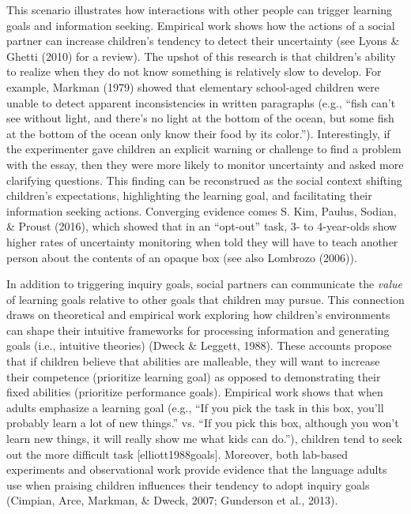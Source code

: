\documentclass[oneside]{report}
\begin{document}
This scenario illustrates how interactions with other people can trigger
learning goals and information seeking. Empirical work shows how the
actions of a social partner can increase children's tendency to detect
their uncertainty (see Lyons \& Ghetti (2010) for a review). The upshot
of this research is that children's ability to realize when they do not
know something is relatively slow to develop. For example, Markman
(1979) showed that elementary school-aged children were unable to detect
apparent inconsistencies in written paragraphs (e.g., ``fish can't see
without light, and there's no light at the bottom of the ocean, but some
fish at the bottom of the ocean only know their food by its color.'').
Interestingly, if the experimenter gave children an explicit warning or
challenge to find a problem with the essay, then they were more likely
to monitor uncertainty and asked more clarifying questions. This finding
can be reconstrued as the social context shifting children's
expectations, highlighting the learning goal, and facilitating their
information seeking actions. Converging evidence comes S. Kim, Paulus,
Sodian, \& Proust (2016), which showed that in an ``opt-out'' task, 3-
to 4-year-olds show higher rates of uncertainty monitoring when told
they will have to teach another person about the contents of an opaque
box (see also Lombrozo (2006)).

In addition to triggering inquiry goals, social partners can communicate
the \emph{value} of learning goals relative to other goals that children
may pursue. This connection draws on theoretical and empirical work
exploring how children's environments can shape their intuitive
frameworks for processing information and generating goals (i.e.,
intuitive theories) (Dweck \& Leggett, 1988). These accounts propose
that if children believe that abilities are malleable, they will want to
increase their competence (prioritize learning goal) as opposed to
demonstrating their fixed abilities (prioritize performance goals).
Empirical work shows that when adults emphasize a learning goal (e.g.,
``If you pick the task in this box, you'll probably learn a lot of new
things.'' vs. ``If you pick this box, although you won't learn new
things, it will really show me what kids can do.''), children tend to
seek out the more difficult task {[}elliott1988goals{]}. Moreover, both
lab-based experiments and observational work provide evidence that the
language adults use when praising children influences their tendency to
adopt inquiry goals (Cimpian, Arce, Markman, \& Dweck, 2007; Gunderson
et al., 2013).
\end{document}
